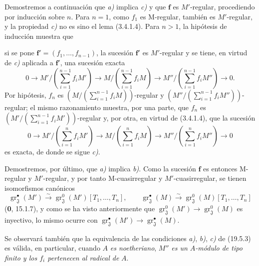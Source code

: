 Demostremos a continuación que \emph{a)} implica \emph{c)} y que $\mathbf f$ es $M'$-regular, procediendo por inducción sobre $n$. Para $n=1$, como $f_1$ es M-regular, también es $M'$-regular, y la propiedad \emph{c)} no es sino el lema (3.4.1.4). Para $n>1$, la hipótesis de inducción muestra que


si se pone $\mathbf f'=(f_1,\ldots,f_{n-1})$, la sucesión $\mathbf f'$ es $M'$-regular y se tiene, en virtud de \emph{c)} aplicada a $\mathbf f'$, una sucesión exacta
\[
  0\longrightarrow M'/(\textstyle\sum_{i=1}^{n-1}f_iM')\longrightarrow M/(\textstyle\sum_{i=1}^{n-1}f_iM)\longrightarrow M''/(\textstyle\sum_{i=1}^{n-1}f_iM'')\longrightarrow0.
\]
Por hipótesis, $f_n$ es $(M/(\sum_{i=1}^{n-1}f_iM))$-regular y $(M''/(\sum_{i=1}^{n-1}f_iM''))$-regular; el mismo razonamiento muestra, por una parte, que $f_n$ es $(M'/(\sum_{i=1}^{n-1}f_iM'))$-regular y, por otra, en virtud de (3.4.1.4), que la sucesión
\[
  0\longrightarrow M'/(\textstyle\sum_{i=1}^{n}f_iM')\longrightarrow M/(\textstyle\sum_{i=1}^{n}f_iM)\longrightarrow M''/(\textstyle\sum_{i=1}^{n}f_iM'')\longrightarrow0
\]
es exacta, de donde se sigue \emph{c)}.

Demostremos, por último, que \emph{a)} implica \emph{b)}. Como la sucesión $\mathbf f$ es entonces M-regular y $M'$-regular, y por tanto M-cuasirregular y $M'$-cuasirregular, se tienen isomorfismos canónicos
\[
  \operatorname{gr}_{\mathfrak J}^\bullet(M')\xrightarrow{\sim}\operatorname{gr}_{\mathfrak J}^0(M')[T_1,\ldots,T_n],
  \qquad
  \operatorname{gr}_{\mathfrak J}^\bullet(M)\xrightarrow{\sim}\operatorname{gr}_{\mathfrak J}^0(M)[T_1,\ldots,T_n]
\]
(\textbf{0}, 15.1.7), y como se ha visto anteriormente que $\operatorname{gr}_{\mathfrak J}^0(M')\to\operatorname{gr}_{\mathfrak J}^0(M)$ es inyectivo, lo mismo ocurre con $\operatorname{gr}_{\mathfrak J}^\bullet(M')\to\operatorname{gr}_{\mathfrak J}^\bullet(M)$.

Se observará también que la equivalencia de las condiciones \emph{a)}, \emph{b)}, \emph{c)} de (19.5.3) es válida, en particular, cuando $A$ \emph{es noetheriano}, $M''$ \emph{es un $A$-módulo de tipo finito y los $f_i$ pertenecen al radical de} $A$.

